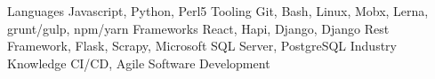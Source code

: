 
\begin{cvskills}
  \cvskill
    {Languages} %
    {Javascript, Python, Perl5} %
  \cvskill
    {Tooling}
    {Git, Bash, Linux, Mobx, Lerna, grunt/gulp, npm/yarn}
  \cvskill
    {Frameworks} %
    {React, Hapi, Django, Django Rest Framework, Flask, Scrapy, Microsoft SQL Server, PostgreSQL} %
  \cvskill
    {Industry Knowledge}
    {CI/CD, Agile Software Development}
\end{cvskills}
